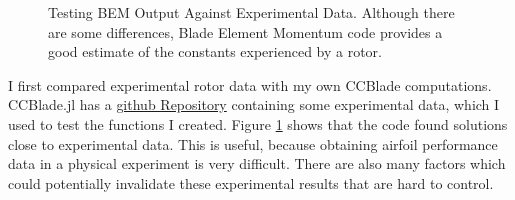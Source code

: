 \documentclass{article}
\begin{document}
\begin{figure}
  \centering

  \hspace{1em}
  \caption{Testing BEM Output Against Experimental Data. \newline Although there are some differences, Blade Element Momentum code provides a good estimate of the constants experienced by a rotor.}
  \label{fig:2}
\end{figure}

I first compared experimental rotor data with my own CCBlade computations. CCBlade.jl has a \href{https://github.com/byuflowlab/CCBlade.jl}{github Repository} containing some experimental data, which I used to test the functions I created. Figure \ref{fig:2} shows that the code found solutions close to experimental data. This is useful, because obtaining airfoil performance data in a physical experiment is very difficult. There are also many factors which could potentially invalidate these experimental results that are hard to control. \newline
\end{document}
